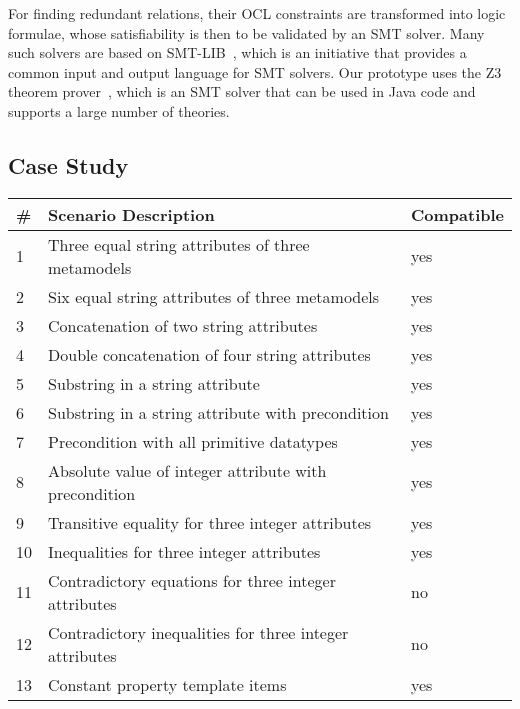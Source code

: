 For finding redundant relations, their \gls{OCL} constraints are transformed into logic formulae, whose satisfiability is then to be validated by an \gls{SMT} solver.
Many such solvers are based on SMT-LIB~\cite{smtlib2017}, which is an initiative that provides a common input and output language for \gls{SMT} solvers.
Our prototype uses the Z3 theorem prover~\cite{z32008}, which is an \gls{SMT} solver that can be used in Java code and supports a large number of theories.


\subsection{Case Study}
\label{chap:correctness_evaluation:compatibility:case_study}

\begin{propertable}
    \renewcommand{\arraystretch}{1.2}%
    \begin{tabular}{L{1.4em} L{22.5em} C{5.7em}}
        \toprule
        \textbf{\#} & \textbf{Scenario Description} & \textbf{Compatible} \\
         & Three equal string attributes of three metamodels & yes\\
        2 & Six equal string attributes of three metamodels & yes\\
        3 & Concatenation of two string attributes & yes\\
        4 & Double concatenation of four string attributes & yes\\
        5 & Substring in a string attribute & yes\\
        6 & Substring in a string attribute with precondition & yes\\
        7 & Precondition with all primitive datatypes & yes\\
        8 & Absolute value of integer attribute with precondition & yes\\
        9 & Transitive equality for three integer attributes & yes\\
        10 & Inequalities for three integer attributes & yes\\
        11 & Contradictory equations for three integer attributes & no\\
        12 & Contradictory inequalities for three integer attributes & no\\
        13 & Constant property template items & yes\\

\end{tabular}
\end{propertable}
